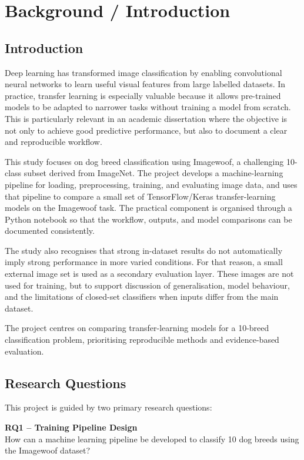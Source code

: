 \documentclass[12pt, a4paper]{article}
\begin{document}
\section{Background / Introduction}

\subsection{Introduction}

Deep learning has transformed image classification by enabling convolutional neural networks to learn useful visual features from large labelled datasets. In practice, transfer learning is especially valuable because it allows pre-trained models to be adapted to narrower tasks without training a model from scratch. This is particularly relevant in an academic dissertation where the objective is not only to achieve good predictive performance, but also to document a clear and reproducible workflow.

This study focuses on dog breed classification using Imagewoof, a challenging 10-class subset derived from ImageNet. The project develops a machine-learning pipeline for loading, preprocessing, training, and evaluating image data, and uses that pipeline to compare a small set of TensorFlow/Keras transfer-learning models on the Imagewoof task. The practical component is organised through a Python notebook so that the workflow, outputs, and model comparisons can be documented consistently.

The study also recognises that strong in-dataset results do not automatically imply strong performance in more varied conditions. For that reason, a small external image set is used as a secondary evaluation layer. These images are not used for training, but to support discussion of generalisation, model behaviour, and the limitations of closed-set classifiers when inputs differ from the main dataset.

The project centres on comparing transfer-learning models for a 10-breed classification problem, prioritising reproducible methods and evidence-based evaluation.

\subsection{Research Questions}

This project is guided by two primary research questions:

\textbf{RQ1 -- Training Pipeline Design}\\
How can a machine learning pipeline be developed to classify 10 dog breeds using the Imagewoof dataset?
\end{document}
